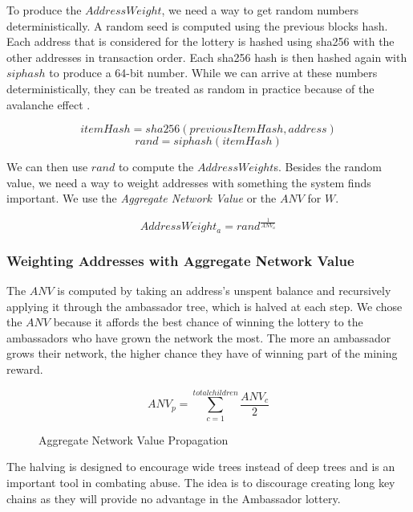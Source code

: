 \documentclass{article}
\begin{document}
To produce the $AddressWeight$, we need a way to get random numbers deterministically.
A random seed is computed using the previous blocks hash. Each address that is considered for the lottery is hashed using sha256 with the other addresses in
transaction order. Each sha256 hash is then hashed again with $siphash$ to produce
a 64-bit number. While we can arrive at these numbers deterministically, they can be treated as random 
in practice because of the avalanche effect \cite{avalanche}.

    $$itemHash = sha256(previousItemHash, address)$$
    $$rand = siphash(itemHash)$$

We can then use $rand$ to compute the $AddressWeight$s. Besides the random value,
we need a way to weight addresses with something the system finds important.
We use the \emph{Aggregate Network Value} or the $ANV$ for $W$.

$$AddressWeight_a = rand^{\frac{1}{ANV_a}}$$

\subsubsection{Weighting Addresses with Aggregate Network Value}

The $ANV$ is computed by taking an address's unspent balance and
recursively applying it through the ambassador tree, which is halved at each step.
We chose the $ANV$ because it affords the best chance of winning the lottery to
 the ambassadors who have grown the network the most.
The more an ambassador grows their network, the higher chance they have of winning
 part of the mining reward.

$$ANV_p = \sum_{c=1}^{total children} \frac{ANV_c}{2}$$

\begin{figure}[H]
    \begin{center}
    \end{center}
    \caption{Aggregate Network Value Propagation}
\end{figure}

The halving is designed to encourage wide trees instead of deep trees and is
an important tool in combating abuse. The idea is to discourage creating long
key chains as they will provide no advantage in the Ambassador lottery.
\end{document}
